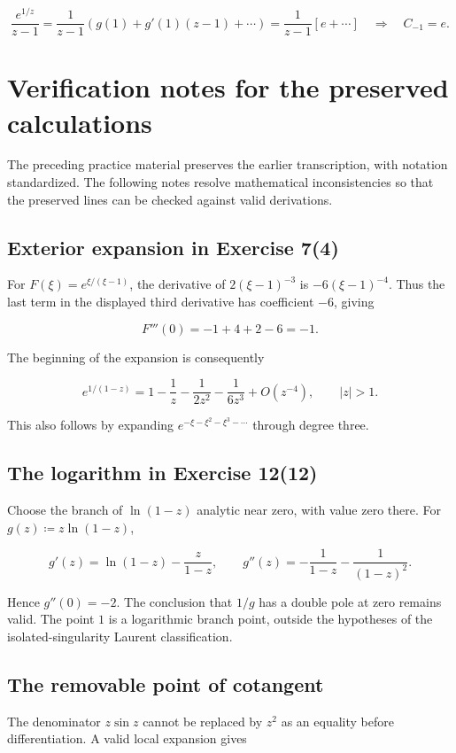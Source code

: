 \documentclass[11pt,a4paper]{article}
\theoremstyle{definition}
\theoremstyle{plain}
\begin{document}
\[
\frac{e^{1/z}}{z-1}=\frac1{z-1}(g(1)+g'(1)(z-1)+\cdots)
=\frac1{z-1}[e+\cdots]\quad\Rightarrow\quad C_{-1}=e.
\]



\section{Verification notes for the preserved calculations}

The preceding practice material preserves the earlier transcription, with notation standardized. The following notes resolve mathematical inconsistencies so that the preserved lines can be checked against valid derivations.

\subsection{Exterior expansion in Exercise 7(4)}

For $F(\xi)=e^{\xi/(\xi-1)}$, the derivative of $2(\xi-1)^{-3}$ is $-6(\xi-1)^{-4}$. Thus the last term in the displayed third derivative has coefficient $-6$, giving

\[
F'''(0)=-1+4+2-6=-1.
\]

The beginning of the expansion is consequently

\[
e^{1/(1-z)}
=1-\frac1z-\frac1{2z^2}-\frac1{6z^3}+O(z^{-4}),\qquad |z|>1.
\]

This also follows by expanding $e^{-\xi-\xi^2-\xi^3-\cdots}$ through degree three.

\subsection{The logarithm in Exercise 12(12)}

Choose the branch of $\ln(1-z)$ analytic near zero, with value zero there. For $g(z)\coloneqq z\ln(1-z)$,

\[
g'(z)=\ln(1-z)-\frac z{1-z},\qquad
g''(z)=-\frac1{1-z}-\frac1{(1-z)^2}.
\]

Hence $g''(0)=-2$. The conclusion that $1/g$ has a double pole at zero remains valid. The point $1$ is a logarithmic branch point, outside the hypotheses of the isolated-singularity Laurent classification.

\subsection{The removable point of cotangent}

The denominator $z\sin z$ cannot be replaced by $z^2$ as an equality before differentiation. A valid local expansion gives
\end{document}
